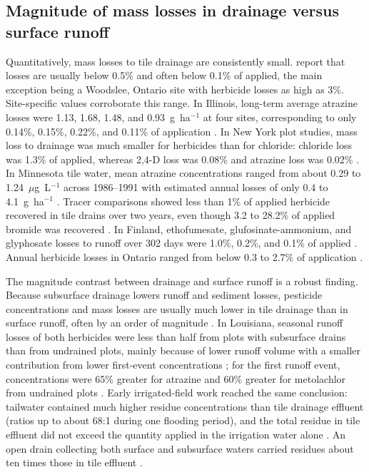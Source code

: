 \subsection{Magnitude of mass losses in drainage versus surface runoff}
Quantitatively, mass losses to tile drainage are consistently small. \textcite{Kladivko2001} report that losses are usually below 0.5\% and often below 0.1\% of applied, the main exception being a Woodslee, Ontario site with herbicide losses as high as 3\%. Site-specific values corroborate this range. In Illinois, long-term average atrazine losses were 1.13, 1.68, 1.48, and 0.93~g~ha$^{-1}$ at four sites, corresponding to only 0.14\%, 0.15\%, 0.22\%, and 0.11\% of application \parencite{Kalita2006}. In New York plot studies, mass loss to drainage was much smaller for herbicides than for chloride: chloride loss was 1.3\% of applied, whereas 2,4-D loss was 0.08\% and atrazine loss was 0.02\% \parencite{Shalit1996}. In Minnesota tile water, mean atrazine concentrations ranged from about 0.29 to 1.24~$\mu$g~L$^{-1}$ across 1986--1991 with estimated annual losses of only 0.4 to 4.1~g~ha$^{-1}$ \parencite{BUHLER1993}. Tracer comparisons showed less than 1\% of applied herbicide recovered in tile drains over two years, even though 3.2 to 28.2\% of applied bromide was recovered \parencite{Fortin2002}. In Finland, ethofumesate, glufosinate-ammonium, and glyphosate losses to runoff over 302 days were 1.0\%, 0.2\%, and 0.1\% of applied \parencite{Siimes2006}. Annual herbicide losses in Ontario ranged from below 0.3 to 2.7\% of application \parencite{Gaynor2001}.

The magnitude contrast between drainage and surface runoff is a robust finding. Because subsurface drainage lowers runoff and sediment losses, pesticide concentrations and mass losses are usually much lower in tile drainage than in surface runoff, often by an order of magnitude \parencite{Kladivko2001}. In Louisiana, seasonal runoff losses of both herbicides were less than half from plots with subsurface drains than from undrained plots, mainly because of lower runoff volume with a smaller contribution from lower first-event concentrations \parencite{SOUTHWICK1990}; for the first runoff event, concentrations were 65\% greater for atrazine and 60\% greater for metolachlor from undrained plots \parencite{SOUTHWICK1990}. Early irrigated-field work reached the same conclusion: tailwater contained much higher residue concentrations than tile drainage effluent (ratios up to about 68:1 during one flooding period), and the total residue in tile effluent did not exceed the quantity applied in the irrigation water alone \parencite{JOHNSTON1967}. An open drain collecting both surface and subsurface waters carried residues about ten times those in tile effluent \parencite{JOHNSTON1967}.

